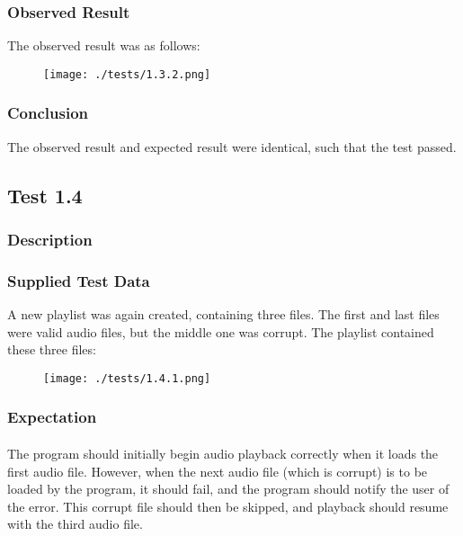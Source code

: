 \subsubsection{Observed Result}
\label{sec:evidence1.3}
The observed result was as follows:
\begin{figure}[H]
	\texttt{[image: ./tests/1.3.2.png]}
\end{figure}

\subsubsection{Conclusion}
The observed result and expected result were identical, such that the test passed.


\pagebreak
\subsection{Test 1.4}
\subsubsection{Description}
\paragraph{}
{
	\centering
}

\subsubsection{Supplied Test Data}
A new playlist was again created, containing three files. The first and last files were valid audio files, but the middle one was corrupt. The playlist contained these three files:
\begin{figure}[H]
	\texttt{[image: ./tests/1.4.1.png]}
\end{figure}

\subsubsection{Expectation}
\paragraph{}
The program should initially begin audio playback correctly when it loads the first audio file. However, when the next audio file (which is corrupt) is to be loaded by the program, it should fail, and the program should notify the user of the error. This corrupt file should then be skipped, and playback should resume with the third audio file.
 
